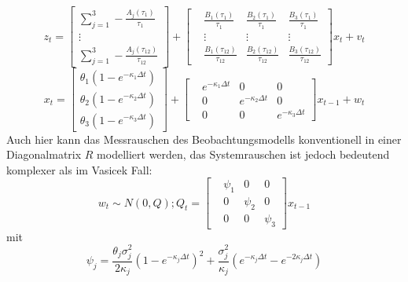 \documentclass[12pt,a4paper,headsepline,bibliography=totoc,listof=totoc,headinclude=false,footinclude=false,BCOR5mm]{scrreprt} %
\begin{document}
\begin{equation}
z_{t} = \left[ \begin{array}{c} \sum_{j=1}^{3}-\frac{A_j(\tau_{1})}{\tau_{1}} \\ \vdots \\ \sum_{j=1}^{3} -\frac{A_j(\tau_{{12}})}{\tau_{{12}}} \end{array} \right] +  \begin{bmatrix} &\frac{B_1(\tau_{1})}{\tau_{1}} & \frac{B_2(\tau_{1})}{\tau_{1}} & \frac{B_3(\tau_{1})}{\tau_{1}}\\ &\vdots & \vdots& \vdots \\ &\frac{B_1(\tau_{{12}})}{\tau_{{12}}} & \frac{B_2(\tau_{{12}})}{\tau_{{12}}} &  \frac{B_3(\tau_{{12}})}{\tau_{{12}}} \end{bmatrix} x_t  +  v_t 
\end{equation}
\begin{equation}
 x_t = \left[ \begin{array}{c} \theta_1(1-e^{-\kappa_{1}\Delta t}) \\\theta_2(1-e^{-\kappa_{2}\Delta t}) \\  \theta_3(1-e^{-\kappa_{3}\Delta t}) \end{array} \right] +  \begin{bmatrix} &e^{-\kappa_{1}\Delta t} & 0 & 0\\ &0 & e^{-\kappa_{2}\Delta t}&0  \\ &0 &0 &  e^{-\kappa_{3}\Delta t}  \end{bmatrix} x_{t-1}   +  w_t 
\end{equation}
Auch hier kann das Messrauschen des Beobachtungsmodells konventionell in einer Diagonalmatrix $R$ modelliert werden, das Systemrauschen ist jedoch bedeutend komplexer als im Vasicek Fall:
\begin{equation}
w_t  \sim N(0,Q); Q_{t} =  \begin{bmatrix} &\psi_{1} & 0 & 0\\ &0 & \psi_{2}  &0  \\ &0 &0 &\psi_{3} \end{bmatrix} x_{t-1} 
\end{equation}
mit 
\begin{equation}
\psi_{j} = \frac{\theta_{j}\sigma^{2}_{j}}{2\kappa_{j}}(1- e^{-\kappa_{j}\Delta t})^{2}+\frac{\sigma^{2}_{j}}{\kappa_{j}}(e^{-\kappa_{j}\Delta t}- e^{-2\kappa_{j}\Delta t})
\end{equation}
\end{document}
